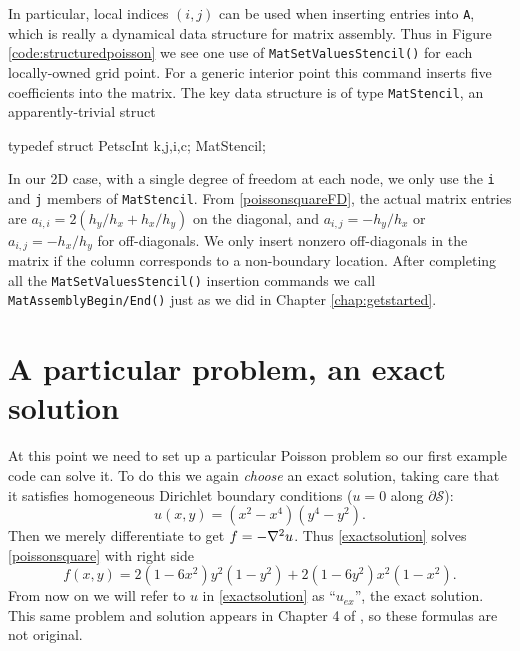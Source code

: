 In particular, local indices $(i,j)$ can be used when inserting entries into \pMat \texttt{A}, which is really a dynamical data structure for matrix assembly.  Thus in Figure \ref{code:structuredpoisson} we see one use of \texttt{MatSetValuesStencil()} for each locally-owned grid point.  For a generic interior point this command inserts five coefficients into the matrix.  The key data structure is of type \texttt{MatStencil}, an apparently-trivial struct
\begin{code}
typedef struct {
  PetscInt k,j,i,c;
} MatStencil;
\end{code}
In our 2D case, with a single degree of freedom at each node, we only use the \texttt{i} and \texttt{j} members of \texttt{MatStencil}.  From \eqref{poissonsquareFD}, the actual matrix entries are $a_{i,i} = 2\left(h_y/h_x + h_x/h_y\right)$ on the diagonal, and $a_{i,j} = -h_y/h_x$ or $a_{i,j} = -h_x/h_y$ for off-diagonals.  We only insert nonzero off-diagonals in the matrix if the column corresponds to a non-boundary location.  After completing all the \texttt{MatSetValuesStencil()} insertion commands we call \texttt{MatAssemblyBegin/End()} just as we did in Chapter \ref{chap:getstarted}.


\section{A particular problem, an exact solution}

At this point we need to set up a particular Poisson problem so our first example code can solve it.  To do this we again \emph{choose} an exact solution, taking care that it satisfies homogeneous Dirichlet boundary conditions ($u=0$ along $\partial \mathcal{S}$):
\begin{equation}
u(x,y) = (x^2 - x^4) (y^4 - y^2). \label{exactsolution}
\end{equation}
Then we merely differentiate to get $f = -\nabla^2 u$.  Thus \eqref{exactsolution} solves \eqref{poissonsquare} with right side
\begin{equation}
f(x,y) = 2 (1 - 6 x^2) y^2 (1 - y^2) + 2 (1 - 6 y^2) x^2 (1 - x^2).\label{manufacturedf}
\end{equation}
From now on we will refer to $u$ in \eqref{exactsolution} as ``$u_{ex}$'', the exact solution.  This same problem and solution appears in Chapter 4 of \citep{Briggsetal2000}, so these formulas are not original. %

